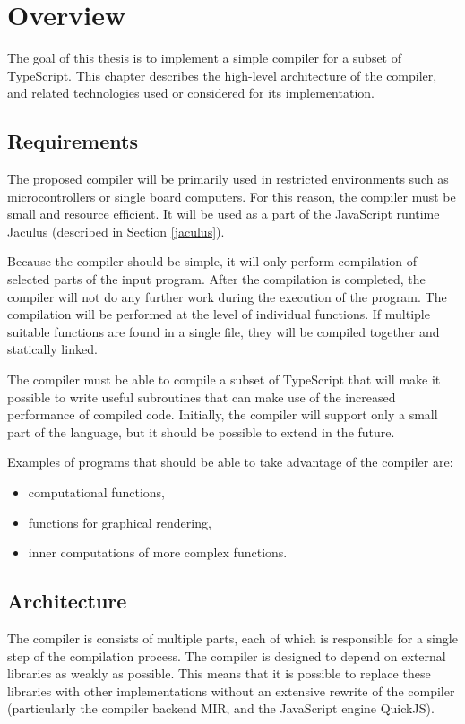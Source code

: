 \chapter{Overview}

The goal of this thesis is to implement a simple compiler for a subset of TypeScript. This chapter describes the high-level architecture of the compiler, and related technologies used or considered for its implementation.


\section{Requirements}

The proposed compiler will be primarily used in restricted environments such as microcontrollers or single board computers. For this reason, the compiler must be small and resource efficient. It will be used as a part of the JavaScript runtime Jaculus (described in Section \ref{jaculus}).

Because the compiler should be simple, it will only perform compilation of selected parts of the input program. After the compilation is completed, the compiler will not do any further work during the execution of the program. The compilation will be performed at the level of individual functions. If multiple suitable functions are found in a single file, they will be compiled together and statically linked.

The compiler must be able to compile a subset of TypeScript that will make it possible to write useful subroutines that can make use of the increased performance of compiled code. Initially, the compiler will support only a small part of the language, but it should be possible to extend in the future.

Examples of programs that should be able to take advantage of the compiler are:
\begin{itemize}
    \item computational functions,
    \item functions for graphical rendering,
    \item inner computations of more complex functions.
\end{itemize}


\section{Architecture}

The compiler is consists of multiple parts, each of which is responsible for a single step of the compilation process. The compiler is designed to depend on external libraries as weakly as possible. This means that it is possible to replace these libraries with other implementations without an extensive rewrite of the compiler (particularly the compiler backend MIR, and the JavaScript engine QuickJS).


